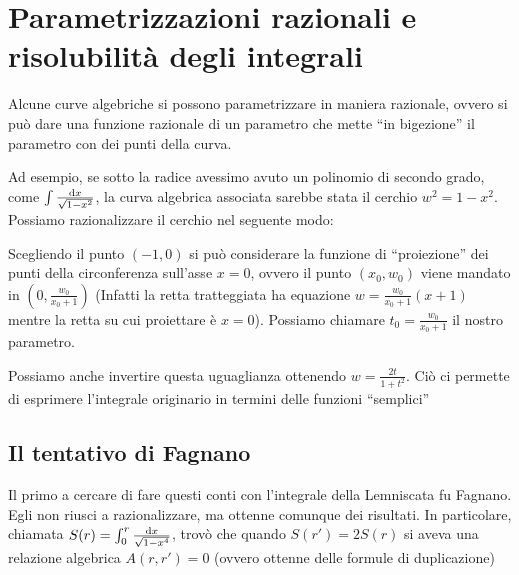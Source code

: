 
\section{Parametrizzazioni razionali e risolubilità degli integrali}
Alcune curve algebriche si possono parametrizzare in maniera razionale, ovvero si può dare una funzione razionale di un parametro che mette ``in bigezione'' il parametro con dei punti della curva.

Ad esempio, se sotto la radice avessimo avuto un polinomio di secondo grado, come $ \int \frac{\text{d} x}{\sqrt{1 - x^2}} $, la curva algebrica
associata sarebbe stata il cerchio $w^2 = 1 - x^2$. Possiamo razionalizzare il cerchio nel seguente modo:

Scegliendo il punto $(-1, 0)$ si può considerare la funzione di ``proiezione'' dei punti della circonferenza sull'asse $x=0$, ovvero il
punto $(x_0, w_0)$ viene mandato in $(0, \frac{w_0}{x_0 + 1})$ (Infatti la retta tratteggiata ha equazione $w = \frac{w_0}{x_0 + 1} (x + 1)$
mentre la retta su cui proiettare è $x=0$). Possiamo chiamare $t_0 = \frac{w_0}{x_0 + 1}$ il nostro parametro.

Possiamo anche invertire questa uguaglianza ottenendo $w = \frac{2 t}{1 + t^2}$. Ciò ci permette di esprimere l'integrale originario in termini delle funzioni ``semplici''


\subsection{Il tentativo di Fagnano}
Il primo a cercare di fare questi conti con l'integrale della Lemniscata fu Fagnano. Egli non riusci a razionalizzare, ma ottenne comunque dei risultati. In particolare, chiamata $S(r) = \int_0^r \frac{\text{d} x}{\sqrt{1 - x^4}}$, trovò che quando $S(r') = 2 S(r)$ si aveva una relazione algebrica $A(r, r') = 0$ (ovvero ottenne delle formule di duplicazione)


